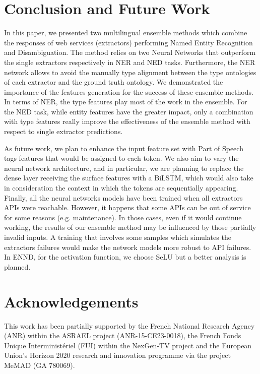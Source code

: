 \documentclass{llncs}
\begin{document}
\section{Conclusion and Future Work}
\label{sec:conclusion}
In this paper, we presented two multilingual ensemble methods which combine the responses of web services (extractors) performing Named Entity Recognition and Disambiguation. The method relies on two Neural Networks that outperform the single extractors respectively in NER and NED tasks. Furthermore, the NER network allows to avoid the manually type alignment between the type ontologies of each extractor and the ground truth ontology. We demonstrated the importance of the features generation for the success of these ensemble methods. In terms of NER, the type features play most of the work in the ensemble. For the NED task, while entity features have the greater impact, only a combination with type features really improve the effectiveness of the ensemble method with respect to single extractor predictions.

As future work, we plan to enhance the input feature set with Part of Speech tags features that would be assigned to each token. We also aim
to vary the neural network architecture, and in particular, we are planning to replace the dense layer receiving the surface features with a BiLSTM, which would also take in consideration the context in which the tokens are sequentially appearing. Finally, all the neural networks models have been trained when all extractors APIs were reachable. However, it happens that some APIs can be out of service for some reasons (e.g. maintenance). In those cases, even if it would continue working, the results of our ensemble method may be influenced by those partially invalid inputs. A training that involves some samples which simulates the extractors failures would make the network models more robust to API failures.
In ENND, for the activation function, we choose SeLU but a better analysis is planned.


\section*{Acknowledgements}
This work has been partially supported by the French National Research Agency (ANR) within the ASRAEL project (ANR-15-CE23-0018), the French Fonds Unique Interminist\'eriel (FUI) within the NexGen-TV project and the European  Union's Horizon 2020 research and innovation programme via the project MeMAD (GA 780069).



\end{document}
